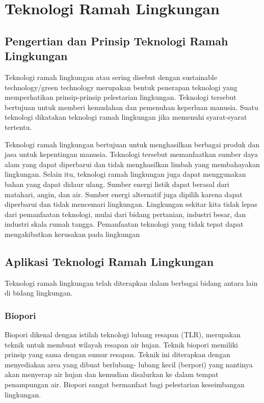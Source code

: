 \documentclass[../wastek.tex]{subfiles}
\begin{document}
\section{Teknologi Ramah Lingkungan}%
\label{sec:teknologi_ramah_lingkungan}

\subsection{Pengertian dan Prinsip Teknologi Ramah Lingkungan}%
\label{sub:pengertian_dan_prinsip_teknologi_ramah_lingkungan}

Teknologi ramah lingkungan atau sering disebut dengan sustainable technology/green technology merupakan bentuk penerapan teknologi yang memperhatikan prinsip-prinsip pelestarian lingkungan. Teknologi tersebut bertujuan untuk memberi kemudahan dan pemenuhan keperluan manusia. Suatu teknologi dikatakan teknologi ramah lingkungan jika memenuhi syarat-syarat tertentu.

Teknologi ramah lingkungan bertujuan untuk menghasilkan berbagai produk dan jasa untuk kepentingan manusia. Teknologi tersebut memanfaatkan sumber daya alam yang dapat diperbarui dan tidak menghasilkan limbah yang membahayakan lingkungan. Selain itu, teknologi ramah lingkungan juga dapat menggunakan bahan yang dapat didaur ulang. Sumber energi listik dapat berasal dari matahari, angin, dan air. Sumber energi alternatif juga dipilih karena dapat diperbarui dan tidak mencemari lingkungan. Lingkungan sekitar kita tidak lepas dari pemanfaatan teknologi, mulai dari bidang pertanian, industri besar, dan industri skala rumah tangga. Pemanfaatan teknologi yang tidak tepat dapat mengakibatkan kerusakan pada lingkungan

\subsection{Aplikasi Teknologi Ramah Lingkungan}%
\label{sub:aplikasi_teknologi_ramah_lingkungan}

Teknologi ramah lingkungan telah diterapkan dalam berbagai bidang antara lain di bidang lingkungan.

\subsubsection{Biopori}%
\label{ssub:biopori}

Biopori dikenal dengan istilah teknologi lubang resapan (TLR), merupakan teknik untuk membuat wilayah resapan air hujan. Teknik biopori memiliki prinsip yang sama dengan sumur resapan. Teknik ini diterapkan dengan menyediakan area yang dibuat berlubang- lubang kecil (berpori) yang nantinya akan menyerap air hujan dan kemudian disalurkan ke dalam tempat penampungan air. Biopori sangat bermanfaat bagi pelestarian keseimbangan lingkungan.
\end{document}
